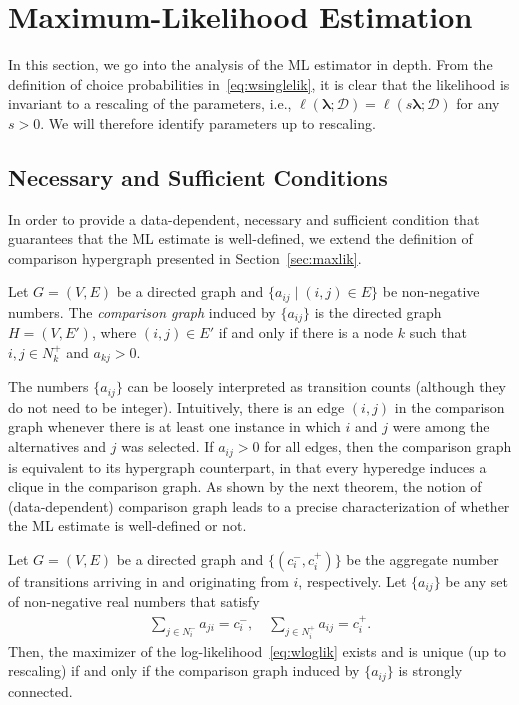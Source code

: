 \section{Maximum-Likelihood Estimation}  %
\label{app:maxlik}

In this section, we go into the analysis of the ML estimator in depth.
From the definition of choice probabilities in~\eqref{eq:wsinglelik}, it is clear that the likelihood is invariant to a rescaling of the parameters, i.e., $\ell(\bm{\lambda}; \mathcal{D}) = \ell(s \bm{\lambda}; \mathcal{D})$ for any $s > 0$.
We will therefore identify parameters up to rescaling.

\subsection{Necessary and Sufficient Conditions}

In order to provide a data-dependent, necessary and sufficient condition that guarantees that the ML estimate is well-defined, we extend the definition of comparison hypergraph presented in Section~\ref{sec:maxlik}.

\begin{definition}
Let $G = (V, E)$ be a directed graph and $\{ a_{ij} \mid (i,j) \in E \}$ be non-negative numbers.
The \emph{comparison graph} induced by $\{ a_{ij} \}$ is the directed graph $H = (V, E')$, where $(i,j) \in E'$ if and only if there is a node $k$ such that $i, j \in N^+_k$ and $a_{kj} > 0$.
\end{definition}

The numbers $\{ a_{ij}\}$ can be loosely interpreted as transition counts (although they do not need to be integer).
Intuitively, there is an edge $(i, j)$ in the comparison graph whenever there is at least one instance in which $i$ and $j$ were among the alternatives and $j$ was selected.
If $a_{ij} > 0$ for all edges, then the comparison graph is equivalent to its hypergraph counterpart, in that every hyperedge induces a clique in the comparison graph.
As shown by the next theorem, the notion of (data-dependent) comparison graph leads to a precise characterization of whether the ML estimate is well-defined or not.

\begin{theorem}
\label{thm:mlboth}
Let $G = (V, E)$ be a directed graph and $\{ (c^-_i, c^+_i) \}$ be the aggregate number of transitions arriving in and originating from $i$, respectively.
Let $\{ a_{ij} \}$ be any set of non-negative real numbers that satisfy
\begin{align*}
\sum_{j \in N^-_i} a_{ji} = c^-_i, \quad
\sum_{j \in N^+_i} a_{ij} = c^+_i.
\end{align*}
Then, the maximizer of the log-likelihood~\eqref{eq:wloglik} exists and is unique (up to rescaling) if and only if the comparison graph induced by $\{ a_{ij} \}$ is strongly connected.
\end{theorem}

